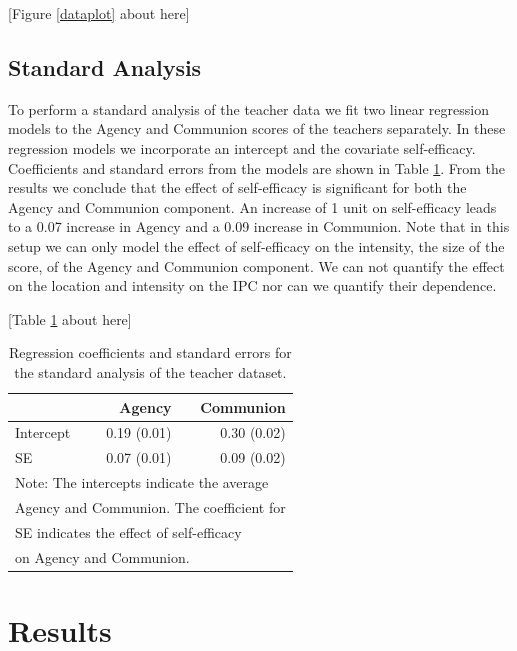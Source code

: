 \documentclass[man,mask]{apa6}
\begin{document}
\hfil \hspace{2cm} {[}Figure \ref{dataplot} about here{]} \hfil

\subsection{Standard Analysis}\label{StandardAnalysis}

To perform a standard analysis of the teacher data we fit two linear regression
models to the Agency and Communion scores of the teachers separately. In these
regression models we incorporate an intercept and the covariate self-efficacy.
Coefficients and standard errors from the models are shown in Table
\ref{Tableteacherstandardanalysis}. From the results we conclude that the effect
of self-efficacy is significant for both the Agency and Communion component. An
increase of 1 unit on self-efficacy leads to a 0.07 increase in Agency and a
0.09 increase in Communion. Note that in this setup we can only model the effect
of self-efficacy on the intensity, the size of the score, of the Agency and
Communion component. We can not quantify the effect on the location and
intensity on the IPC nor can we quantify their dependence.

\hfil \hspace{2cm} {[}Table \ref{Tableteacherstandardanalysis} about here{]} \hfil

\begin{table}[h]
\centering
\caption{Regression coefficients and standard errors for the standard analysis of the teacher dataset.} 
\begin{tabular}{lrr}
  \noalign{\smallskip}\hline\noalign{\smallskip}
  & Agency & Communion \\\hline\noalign{\smallskip}
Intercept & 0.19 (0.01) & 0.30 (0.02) \\
SE & 0.07 (0.01) & 0.09 (0.02) \\ \hline
\multicolumn{3}{l}{Note: The intercepts indicate the average }\\
\multicolumn{3}{l}{Agency and Communion. The coefficient for }\\
\multicolumn{3}{l}{SE indicates the effect of self-efficacy }\\
\multicolumn{3}{l}{on Agency and Communion.}
\end{tabular}
\label{Tableteacherstandardanalysis}
\end{table}

\section{Results}\label{DataAnalysis}
\end{document}
